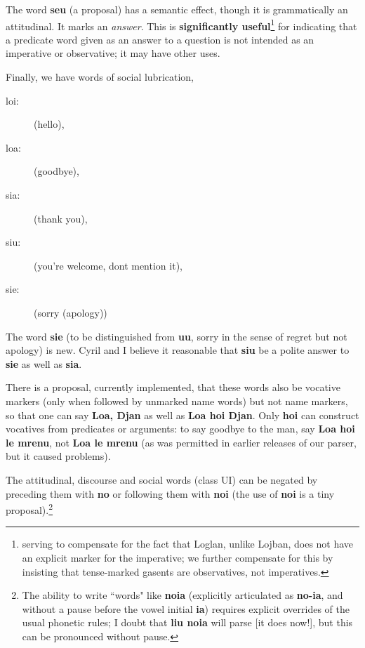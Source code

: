 \documentclass[12pt]{book}
\begin{document}
{The word {\bf seu} (a proposal) has a semantic effect, though it is grammatically an attitudinal.  It marks an {\em answer\/}.  This
is {\bf significantly useful}\footnote{serving to compensate for the fact that Loglan, unlike Lojban, does not have an explicit marker for the imperative; we further compensate for this by insisting that tense-marked gasents are observatives, not imperatives.} for indicating that a predicate word given as an answer to a question is not intended as an imperative or observative; it may have other uses.

Finally, we have words of social lubrication, 

\begin{description}
\item[loi:]  (hello),

\item[loa:]  (goodbye), 

\item[sia:]  (thank you), 

\item[siu:]   (you're welcome, dont mention it),

\item[sie:]  (sorry (apology))

\end{description}

The word {\bf sie} (to be distinguished from {\bf uu}, sorry in the sense of regret but not apology) is new.   Cyril and I believe it reasonable that {\bf siu} be a polite answer to {\bf sie} as well as {\bf sia}.   

There is a proposal, currently implemented, that these words also be vocative markers (only when followed by unmarked name words) but not name markers, so that one can say {\bf Loa, Djan} as well as {\bf Loa hoi Djan}.   Only {\bf hoi} can construct vocatives from predicates or arguments:  to say goodbye to the man, say {\bf Loa hoi le mrenu}, not {\bf Loa le mrenu} (as was permitted in earlier releases of our parser, but it caused problems).

The attitudinal, discourse and social words (class UI) can be negated by preceding them with {\bf no} or following them with {\bf noi} (the use of {\bf noi} is a tiny proposal).\footnote{The ability to write ``words" like {\bf noia} (explicitly articulated as {\bf no-ia}, and without a pause before the vowel initial {\bf ia})  requires explicit overrides of the usual phonetic rules; I doubt that {\bf liu noia} will parse [it does now!], but this can be pronounced without pause.}

}
\end{document}
